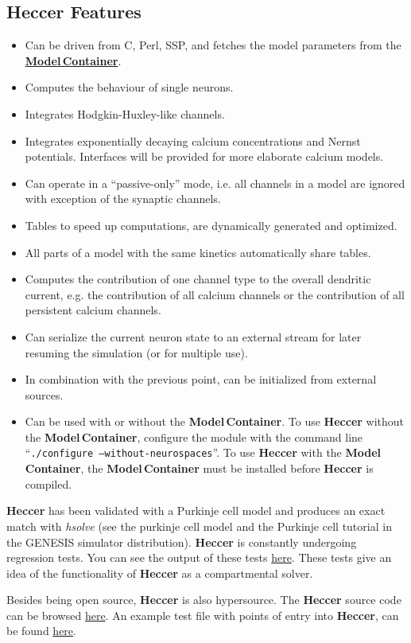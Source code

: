 \documentclass[12pt]{article}
\begin{document}
\subsection*{Heccer Features}

\begin{itemize}

\item Can be driven from C, Perl, SSP, and fetches the model parameters from the \href{../model-container/model-container.tex}{\bf Model\,Container}.
\item Computes the behaviour of single neurons.
\item Integrates Hodgkin-Huxley-like channels.
\item Integrates exponentially decaying calcium concentrations and Nernst potentials. Interfaces will be provided for more elaborate calcium models.
\item Can operate in a ``passive-only'' mode, i.e. all channels in a model are ignored with exception of the synaptic channels.
\item Tables to speed up computations, are dynamically generated and optimized.
\item All parts of a model with the same kinetics automatically share tables.
\item Computes the contribution of one channel type to the overall dendritic current, e.g. the contribution of all calcium channels or the contribution of all persistent calcium channels.
\item Can serialize the current neuron state to an external stream for later resuming the simulation (or for multiple use).
\item In combination with the previous point, can be initialized from external sources.
\item Can be used with or without the {\bf Model\,Container}. To use {\bf Heccer} without the {\bf Model\,Container}, configure the module with the command line ``{\tt ./configure --without-neurospaces}''. To use {\bf Heccer} with the {\bf Model\,Container}, the {\bf Model\,Container} must be installed before {\bf Heccer} is compiled. 
\end{itemize}
{\bf Heccer} has been validated with a Purkinje cell model and produces an exact match with {\it hsolve} (see the purkinje cell model and the Purkinje cell tutorial in the GENESIS simulator distribution). {\bf Heccer} is constantly undergoing regression tests. You can see the output of these tests \href{}{here}. These tests give an idea of the functionality of {\bf Heccer} as a compartmental solver.

Besides being open source, {\bf Heccer} is also hypersource. The {\bf Heccer} source code can be browsed \href{}{here}. An example test file with points of entry into {\bf Heccer}, can be found \href{}{here}.
 
\end{document}
